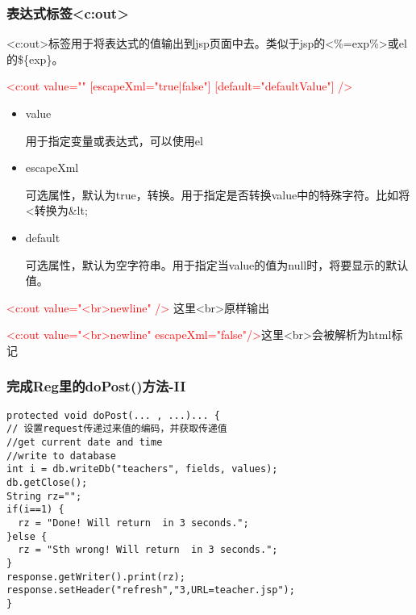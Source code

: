 \documentclass{beamer}
\begin{document}
\begin{frame}
\frametitle{表达式标签<c:out>}
<c:out>标签用于将表达式的值输出到jsp页面中去。类似于jsp的<\%=exp\%>或el的\$\{exp\}。

\textcolor{red}{<c:out value="" [escapeXml="true|false"]  [default="defaultValue"] />}
\begin{itemize}
\item
value

用于指定变量或表达式，可以使用el
\item
escapeXml

可选属性，默认为true，转换。用于指定是否转换value中的特殊字符。比如将<转换为\&lt;
\item
default

可选属性，默认为空字符串。用于指定当value的值为null时，将要显示的默认值。
\end{itemize}
\textcolor{red}{<c:out value="<br>newline" />} 这里<br>原样输出 

\textcolor{red}{ <c:out value="<br>newline" escapeXml="false"/>}这里<br>会被解析为html标记
\end{frame}
\begin{frame}[fragile]
\frametitle{完成Reg里的doPost()方法-II}
\begin{lstlisting}
protected void doPost(... , ...)... {
// 设置request传递过来值的编码，并获取传递值
//get current date and time
//write to database
int i = db.writeDb("teachers", fields, values);
db.getClose();
String rz="";
if(i==1) {
  rz = "Done! Will return  in 3 seconds.";
}else {
  rz = "Sth wrong! Will return  in 3 seconds.";
}
response.getWriter().print(rz);
response.setHeader("refresh","3,URL=teacher.jsp");
}
\end{lstlisting}
\end{frame}
\end{document}

